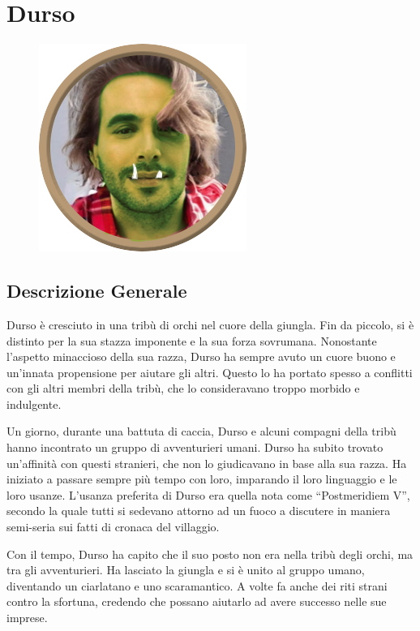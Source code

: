 \section{Durso}\label{durso}


\begin{figure}
\centering
\includegraphics{Durso.png}
\end{figure}

\subsection{Descrizione Generale}\label{descrizione-generale}



Durso è cresciuto in una tribù di orchi nel cuore della giungla. Fin da
piccolo, si è distinto per la sua stazza imponente e la sua forza
sovrumana. Nonostante l'aspetto minaccioso della sua razza, Durso ha
sempre avuto un cuore buono e un'innata propensione per aiutare gli
altri. Questo lo ha portato spesso a conflitti con gli altri membri
della tribù, che lo consideravano troppo morbido e indulgente.

Un giorno, durante una battuta di caccia, Durso e alcuni compagni della
tribù hanno incontrato un gruppo di avventurieri umani. Durso ha subito
trovato un'affinità con questi stranieri, che non lo giudicavano in base
alla sua razza. Ha iniziato a passare sempre più tempo con loro,
imparando il loro linguaggio e le loro usanze. L'usanza preferita di
Durso era quella nota come ``Postmeridiem V'', secondo la quale tutti si
sedevano attorno ad un fuoco a discutere in maniera semi-seria sui fatti
di cronaca del villaggio.

Con il tempo, Durso ha capito che il suo posto non era nella tribù degli
orchi, ma tra gli avventurieri. Ha lasciato la giungla e si è unito al
gruppo umano, diventando un ciarlatano e uno scaramantico. A volte fa
anche dei riti strani contro la sfortuna, credendo che possano aiutarlo
ad avere successo nelle sue imprese.

